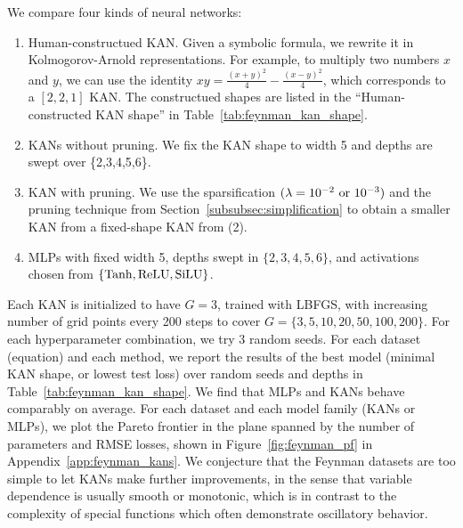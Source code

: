 \documentclass{article}
\numberwithin{equation}{section}
\numberwithin{figure}{section}
\begin{document}
We compare four kinds of neural networks: 
\begin{enumerate}[(1)]
    \item  Human-constructued KAN. Given a symbolic formula, we rewrite it in Kolmogorov-Arnold representations. For example, to multiply two numbers $x$ and $y$, we can use the identity $xy=\frac{(x+y)^2}{4}-\frac{(x-y)^2}{4}$, which corresponds to a $[2,2,1]$ KAN. The constructued shapes are listed in the ``Human-constructed KAN shape'' in Table~\ref{tab:feynman_kan_shape}.
    \item KANs without pruning. We fix the KAN shape to width 5 and depths are swept over \{2,3,4,5,6\}.
    \item KAN with pruning. We use the sparsification $(\lambda=10^{-2}\ {\rm or}\ 10^{-3})$ and the pruning technique from Section~\ref{subsubsec:simplification} to obtain a smaller KAN from a fixed-shape KAN from (2).
    \item MLPs with fixed width 5, depths swept in $\{2,3,4,5,6\}$, and activations chosen from $\{{\rm Tanh},{\rm ReLU},{\rm SiLU}\}$.
\end{enumerate}
Each KAN is initialized to have $G=3$, trained with LBFGS, with increasing number of grid points every 200 steps to cover $G=\{3,5,10,20,50,100,200\}$. For each hyperparameter combination, we try 3 random seeds. For each dataset (equation) and each method, we report the results of the best model (minimal KAN shape, or lowest test loss) over random seeds and depths in Table~\ref{tab:feynman_kan_shape}. We find that MLPs and KANs behave comparably on average. For each dataset and each model family (KANs or MLPs), we plot the Pareto frontier in the plane spanned by the number of parameters and RMSE losses, shown in Figure~\ref{fig:feynman_pf} in Appendix~\ref{app:feynman_kans}. We conjecture that the Feynman datasets are too simple to let KANs make further improvements, in the sense that variable dependence is usually smooth or monotonic, which is in contrast to the complexity of special functions which often demonstrate oscillatory behavior. 



\end{document}
